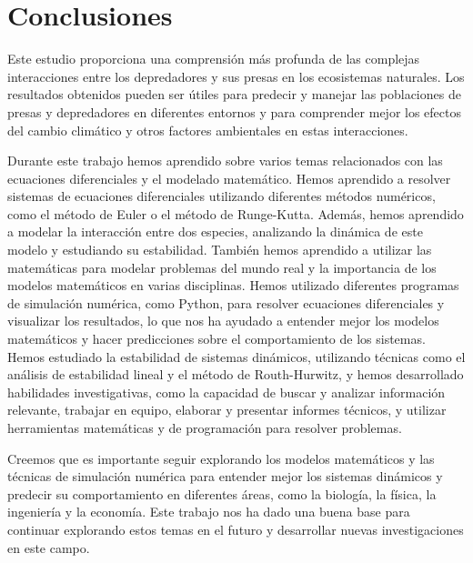 \documentclass{wscpaperproc}
\theoremstyle{wsc}
\begin{document}
\section*{Conclusiones}
Este estudio proporciona una comprensi\'on más profunda de las complejas interacciones entre los depredadores y sus presas en
los ecosistemas naturales. Los resultados obtenidos pueden ser \'utiles para predecir y manejar las poblaciones de presas y
depredadores en diferentes entornos y para comprender mejor los efectos del cambio clim\'atico y otros factores ambientales
en estas interacciones. \par
Durante este trabajo hemos aprendido sobre varios temas relacionados con las ecuaciones diferenciales 
y el modelado matemático. Hemos aprendido a resolver sistemas de ecuaciones diferenciales utilizando diferentes 
métodos numéricos, como el método de Euler o el método de Runge-Kutta. Además, hemos aprendido a modelar la interacción entre 
dos especies, analizando la dinámica de este modelo y estudiando su estabilidad. También hemos aprendido a utilizar las matemáticas 
para modelar problemas del mundo real y la importancia de los modelos matemáticos en varias disciplinas. Hemos utilizado diferentes 
programas de simulación numérica, como Python, para resolver ecuaciones diferenciales y visualizar los resultados, lo que 
nos ha ayudado a entender mejor los modelos matemáticos y hacer predicciones sobre el comportamiento de los sistemas. Hemos estudiado 
la estabilidad de sistemas dinámicos, utilizando técnicas como el análisis de estabilidad lineal y el método de Routh-Hurwitz, y hemos 
desarrollado habilidades investigativas, como la capacidad de buscar y analizar información relevante, trabajar en equipo, elaborar y 
presentar informes técnicos, y utilizar herramientas matemáticas y de programación para resolver problemas. \par
Creemos que es importante seguir explorando los modelos matemáticos y las técnicas de simulación numérica para entender mejor 
los sistemas dinámicos y predecir su comportamiento en diferentes áreas, como la biología, la física, la ingeniería y 
la economía. Este trabajo nos ha dado una buena base para continuar explorando estos temas en el futuro y desarrollar
nuevas investigaciones en este campo.


\end{document}
